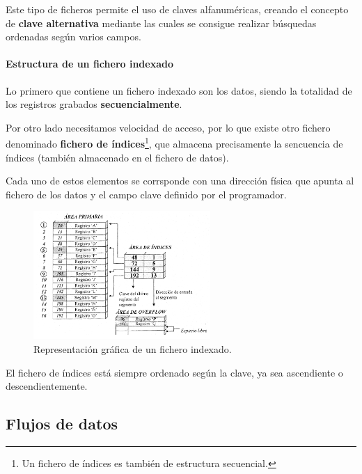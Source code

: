 \documentclass[a4paper, 11pt, titlepage]{article}
\begin{document}
            Este tipo de ficheros permite el uso de claves alfanuméricas, creando el concepto de \textbf{clave 
            alternativa} mediante las cuales se consigue realizar búsquedas ordenadas según varios campos.

            \paragraph{Estructura de un fichero indexado}

            Lo primero que contiene un fichero indexado son los datos, siendo la totalidad de los registros 
            grabados \textbf{secuencialmente}.

            Por otro lado necesitamos velocidad de acceso, por lo que existe otro fichero denominado 
            \textbf{fichero de índices}\footnote{
                Un fichero de índices es también de estructura secuencial.
            }, que almacena precisamente la sencuencia de índices (también almacenado
            en el fichero de datos).

            Cada uno de estos elementos se corrsponde con una dirección física que apunta al fichero de los datos 
            y el campo clave definido por el programador.

            \begin{figure}[htp]
                \centering
                \includegraphics[width=0.6\textwidth]{resources/ficheros01.png}
                \caption{Representación gráfica de un fichero indexado.}
                \label{ficheros01}
            \end{figure}

            El fichero de índices está siempre ordenado según la clave, ya sea ascendiente o descendientemente.
    
    \subsection{Flujos de datos}
\end{document}
